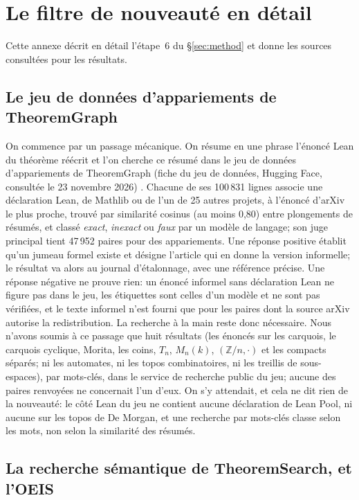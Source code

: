 \section{Le filtre de nouveauté en détail}\label{app:novelty}

Cette annexe décrit en détail l'étape~6 du \S\ref{sec:method} et donne les sources consultées pour les résultats.

\subsection{Le jeu de données d'appariements de TheoremGraph}

On commence par un passage mécanique. On résume en une phrase l'énoncé Lean du théorème réécrit et l'on cherche ce résumé dans le jeu de données d'appariements de TheoremGraph (fiche du jeu de données, Hugging Face, consultée le 23 novembre 2026) \cite{theoremgraph-matching}. Chacune de ses 100\,831 lignes associe une déclaration Lean, de Mathlib ou de l'un de 25 autres projets, à l'énoncé d'arXiv le plus proche, trouvé par similarité cosinus (au moins 0,80) entre plongements de résumés, et classé \emph{exact}, \emph{inexact} ou \emph{faux} par un modèle de langage; son juge principal tient 47\,952 paires pour des appariements. Une réponse positive établit qu'un jumeau formel existe et désigne l'article qui en donne la version informelle; le résultat va alors au journal d'étalonnage, avec une référence précise. Une réponse négative ne prouve rien: un énoncé informel sans déclaration Lean ne figure pas dans le jeu, les étiquettes sont celles d'un modèle et ne sont pas vérifiées, et le texte informel n'est fourni que pour les paires dont la source arXiv autorise la redistribution. La recherche à la main reste donc nécessaire. Nous n'avons soumis à ce passage que huit résultats (les énoncés sur les carquois, le carquois cyclique, Morita, les coins, $T_n$, $M_n(k)$, $(\mathbb Z/n,\cdot)$ et les compacts séparés; ni les automates, ni les topos combinatoires, ni les treillis de sous-espaces), par mots-clés, dans le service de recherche public du jeu; aucune des paires renvoyées ne concernait l'un d'eux. On s'y attendait, et cela ne dit rien de la nouveauté: le côté Lean du jeu ne contient aucune déclaration de Lean Pool, ni aucune sur les topos de De Morgan, et une recherche par mots-clés classe selon les mots, non selon la similarité des résumés.

\subsection{La recherche sémantique de TheoremSearch, et l'OEIS}

